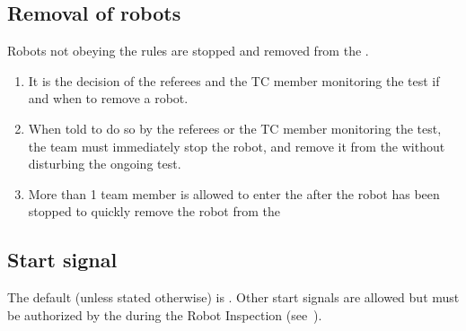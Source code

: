 \subsection{Removal of robots}
\label{rule:robot_removal}
Robots not obeying the rules are stopped and removed from the \Arena{}.
\begin{enumerate}
	\item It is the decision of the referees and the TC member monitoring the test if and when to remove a robot.

	\item When told to do so by the referees or the TC member monitoring the test, the team must immediately stop the robot, and remove it from the \Arena{} without disturbing the ongoing test.
	
	\item More than 1 team member is allowed to enter the \Arena{} after the robot has been stopped to quickly remove the robot from the \Arena{}

\end{enumerate}


\subsection{Start signal}\label{rule:start_signal}
The default  (unless stated otherwise) is .
Other start signals are allowed but must be authorized by the  during the Robot Inspection (see~).

